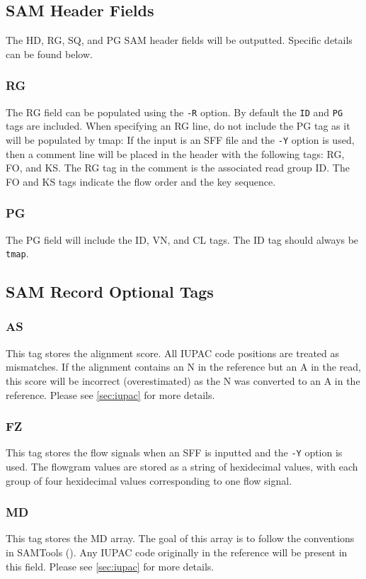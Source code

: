 \documentclass[a4paper,12pt]{book}
\newcommand{\TT}[1]{{\tt #1}} %
\begin{document}
\subsection{SAM Header Fields}

The HD, RG, SQ, and PG SAM header fields will be outputted.
Specific details can be found below.

\subsubsection{RG}
The RG field can be populated using the \TT{-R} option.
By default the \TT{ID} and \TT{PG} tags are included.
When specifying an RG line, do not include the PG tag as it will be populated by tmap:
If the input is an SFF file and the \TT{-Y} option is used, then a comment line will be placed in the header with the following tags:
RG, FO, and KS.
The RG tag in the comment is the associated read group ID.
The FO and KS tags indicate the flow order and the key sequence.

\subsubsection{PG}
The PG field will include the ID, VN, and CL tags.
The ID tag should always be \TT{tmap}.

\subsection{SAM Record Optional Tags}

\subsubsection{AS}
This tag stores the alignment score.
All IUPAC code positions are treated as mismatches.
If the alignment contains an N in the reference but an A in the read, this score will be incorrect (overestimated) as the N was converted to an A in the reference.
Please see \autoref{sec:iupac} for more details. 

\subsubsection{FZ}
This tag stores the flow signals when an SFF is inputted and the \TT{-Y} option is used.
The flowgram values are stored as a string of hexidecimal values, with each group of four hexidecimal values corresponding to one flow signal.

\subsubsection{MD}
This tag stores the MD array.
The goal of this array is to follow the conventions in SAMTools (\cite{SAM-format}).
Any IUPAC code originally in the reference will be present in this field.
Please see \autoref{sec:iupac} for more details. 
\end{document}
